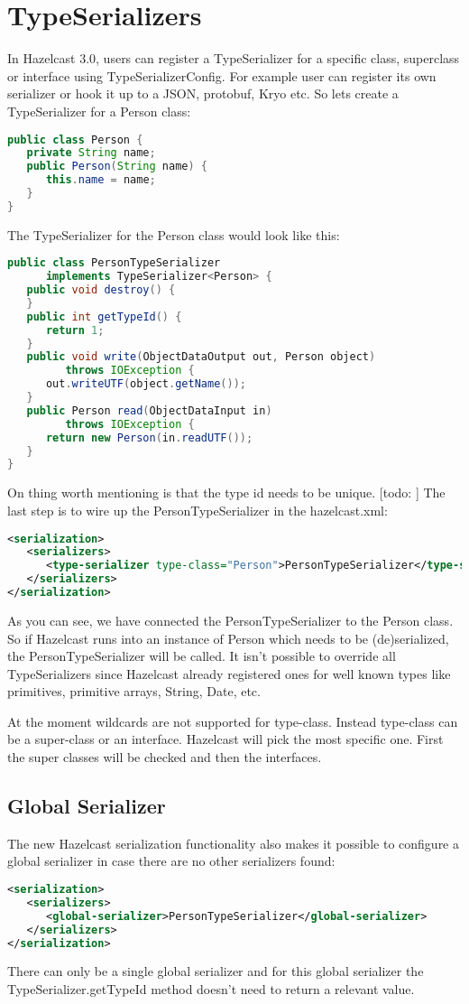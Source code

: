 \section{TypeSerializers}
In Hazelcast 3.0, users can register a TypeSerializer for a specific class, superclass or interface using TypeSerializerConfig. For example user can register its own serializer or hook it up to a JSON, protobuf, Kryo etc. So lets create a TypeSerializer for a Person class:
\begin{lstlisting}[language=java]
public class Person {
   private String name;
   public Person(String name) {
      this.name = name;
   }
}
\end{lstlisting}
The TypeSerializer for the Person class would look like this:
\begin{lstlisting}[language=java]
public class PersonTypeSerializer 
      implements TypeSerializer<Person> {
   public void destroy() {	  
   }
   public int getTypeId() {
      return 1;
   }
   public void write(ObjectDataOutput out, Person object) 
         throws IOException {
      out.writeUTF(object.getName());
   }
   public Person read(ObjectDataInput in) 
         throws IOException {
      return new Person(in.readUTF());
   }
}
\end{lstlisting}
On thing worth mentioning is that the type id needs to be unique. [todo: ] The last step is to wire up the PersonTypeSerializer in the hazelcast.xml:
\begin{lstlisting}[language=xml]
<serialization>
   <serializers>
      <type-serializer type-class="Person">PersonTypeSerializer</type-serializer>
   </serializers>
</serialization>
\end{lstlisting}
As you can see, we have connected the PersonTypeSerializer to the Person class. So if Hazelcast runs into an instance of Person which needs to be (de)serialized, the PersonTypeSerializer will be called. It isn't possible to override all TypeSerializers since Hazelcast already registered ones for well known types like primitives, primitive arrays, String, Date, etc.

At the moment wildcards are not supported for type-class. Instead type-class can be a super-class or an interface. Hazelcast will pick the most specific one. First the super classes will be checked and then the interfaces.

\subsection{Global Serializer}
The new Hazelcast serialization functionality also makes it possible to configure a global serializer in case there are no other serializers found:
\begin{lstlisting}[language=xml]
<serialization>
   <serializers>
      <global-serializer>PersonTypeSerializer</global-serializer>
   </serializers>
</serialization>
\end{lstlisting}
There can only be a single global serializer and for this global serializer the TypeSerializer.getTypeId method doesn't need to return a relevant value.

